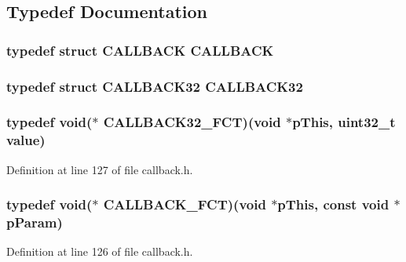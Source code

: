 \subsection{Typedef Documentation}
\hypertarget{a00466_adf4a34e2218cc4d030a3c4c114f2aec4}{
\subsubsection[{CALLBACK}]{\setlength{\rightskip}{0pt plus 5cm}typedef struct {\bf CALLBACK}  {\bf CALLBACK}}}
\label{a00466_adf4a34e2218cc4d030a3c4c114f2aec4}
\hypertarget{a00466_a739fda39fcdba5f5452566a5f00330cc}{
\subsubsection[{CALLBACK32}]{\setlength{\rightskip}{0pt plus 5cm}typedef struct {\bf CALLBACK32}  {\bf CALLBACK32}}}
\label{a00466_a739fda39fcdba5f5452566a5f00330cc}
\hypertarget{a00466_a2c7065cf157f660a6d0ff87a54557e3c}{
\subsubsection[{CALLBACK32\_\-FCT}]{\setlength{\rightskip}{0pt plus 5cm}typedef void($\ast$ {\bf CALLBACK32\_\-FCT})(void $\ast$pThis, uint32\_\-t value)}}
\label{a00466_a2c7065cf157f660a6d0ff87a54557e3c}


Definition at line 127 of file callback.h.

\hypertarget{a00466_ab3b2472495860a1aec38b904c5ac0522}{
\subsubsection[{CALLBACK\_\-FCT}]{\setlength{\rightskip}{0pt plus 5cm}typedef void($\ast$ {\bf CALLBACK\_\-FCT})(void $\ast$pThis, const void $\ast$pParam)}}
\label{a00466_ab3b2472495860a1aec38b904c5ac0522}


Definition at line 126 of file callback.h.

